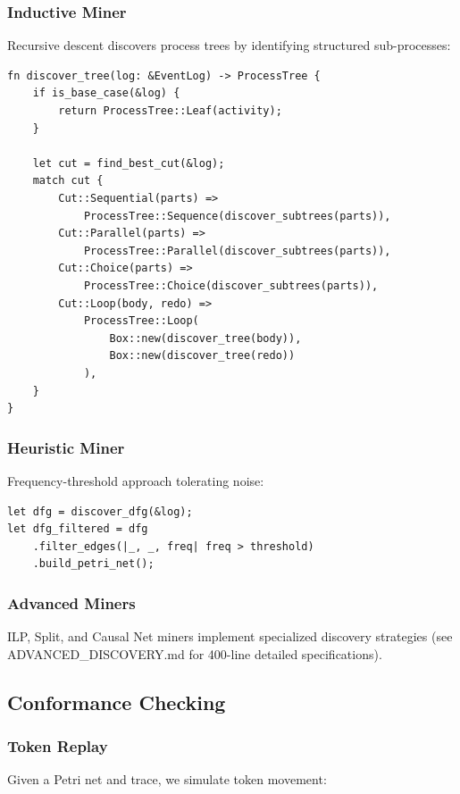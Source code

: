 \documentclass[11pt,twocolumn]{article}
\begin{document}
\subsubsection{Inductive Miner}
Recursive descent discovers process trees by identifying structured sub-processes:

\begin{lstlisting}
fn discover_tree(log: &EventLog) -> ProcessTree {
    if is_base_case(&log) {
        return ProcessTree::Leaf(activity);
    }

    let cut = find_best_cut(&log);
    match cut {
        Cut::Sequential(parts) =>
            ProcessTree::Sequence(discover_subtrees(parts)),
        Cut::Parallel(parts) =>
            ProcessTree::Parallel(discover_subtrees(parts)),
        Cut::Choice(parts) =>
            ProcessTree::Choice(discover_subtrees(parts)),
        Cut::Loop(body, redo) =>
            ProcessTree::Loop(
                Box::new(discover_tree(body)),
                Box::new(discover_tree(redo))
            ),
    }
}
\end{lstlisting}

\subsubsection{Heuristic Miner}
Frequency-threshold approach tolerating noise:

\begin{lstlisting}
let dfg = discover_dfg(&log);
let dfg_filtered = dfg
    .filter_edges(|_, _, freq| freq > threshold)
    .build_petri_net();
\end{lstlisting}

\subsubsection{Advanced Miners}
ILP, Split, and Causal Net miners implement specialized discovery strategies (see ADVANCED\_DISCOVERY.md for 400-line detailed specifications).

\subsection{Conformance Checking}

\subsubsection{Token Replay}
Given a Petri net and trace, we simulate token movement:
\end{document}
